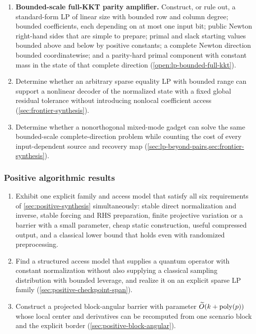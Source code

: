 \begin{enumerate}[leftmargin=*,label=F\arabic*.]
 \item \textbf{Bounded-scale full-KKT parity amplifier.}  Construct, or rule
 out, a standard-form LP of linear size with bounded row and column degree;
 bounded coefficients, each depending on at most one input bit; public Newton
 right-hand sides that are simple to prepare; primal and slack starting
 values bounded above and below by positive constants; a complete Newton
 direction bounded coordinatewise; and a parity-hard primal component with
 constant mass in the state of that complete direction
 (\cref{open:lp-bounded-full-kkt}).
 \item Determine whether an arbitrary sparse equality LP with bounded range
 can support a nonlinear decoder of the normalized state with a fixed global
 residual tolerance without introducing nonlocal coefficient access
 (\cref{sec:frontier-synthesis}).
 \item Determine whether a nonorthogonal mixed-mode gadget can solve the same
 bounded-scale complete-direction problem while counting the cost of every
 input-dependent source and recovery map
 (\cref{sec:lp-beyond-pairs,sec:frontier-synthesis}).
\end{enumerate}

\subsubsection{Positive algorithmic results}

\begin{enumerate}[leftmargin=*,label=P\arabic*.]
 \item Exhibit one explicit family and access model that satisfy all six
 requirements of \cref{sec:positive-synthesis} simultaneously: stable direct
 normalization and inverse, stable forcing and RHS preparation, finite
 projective variation or a barrier with a small parameter, cheap static
 construction, useful compressed output, and a classical lower bound that
 holds even with randomized preprocessing.
 \item Find a structured access model that supplies a quantum operator with
 constant normalization without also supplying a classical sampling
 distribution with bounded leverage, and realize it on an explicit sparse LP
 family (\cref{sec:positive-checkpoint-span}).
 \item Construct a projected block-angular barrier with parameter
 \(\widetilde{O}(k+\operatorname{poly}(p))\) whose local center and derivatives can be recomputed
 from one scenario block and the explicit border
 (\cref{sec:positive-block-angular}).
\end{enumerate}

